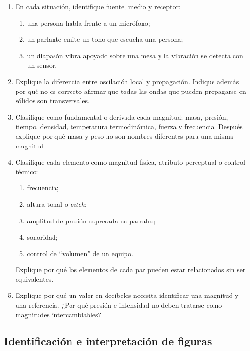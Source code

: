 \begin{enumerate}[label=\textbf{C\arabic*.},leftmargin=*]
    \item En cada situación, identifique fuente, medio y receptor:
    \begin{enumerate}[label=\alph*)]
        \item una persona habla frente a un micrófono;
        \item un parlante emite un tono que escucha una persona;
        \item un diapasón vibra apoyado sobre una mesa y la vibración se detecta con un sensor.
    \end{enumerate}

    \item Explique la diferencia entre oscilación local y propagación. Indique además por qué no es correcto afirmar que todas las ondas que pueden propagarse en sólidos son transversales.

    \item Clasifique como fundamental o derivada cada magnitud: masa, presión, tiempo, densidad, temperatura termodinámica, fuerza y frecuencia. Después explique por qué masa y peso no son nombres diferentes para una misma magnitud.

    \item Clasifique cada elemento como magnitud física, atributo perceptual o control técnico:
    \begin{enumerate}[label=\alph*)]
        \item frecuencia;
        \item altura tonal o \emph{pitch};
        \item amplitud de presión expresada en pascales;
        \item sonoridad;
        \item control de ``volumen'' de un equipo.
    \end{enumerate}
    Explique por qué los elementos de cada par pueden estar relacionados sin ser equivalentes.

    \item Explique por qué un valor en decibeles necesita identificar una magnitud y una referencia. ¿Por qué presión e intensidad no deben tratarse como magnitudes intercambiables?
\end{enumerate}

\subsection*{Identificación e interpretación de figuras}

